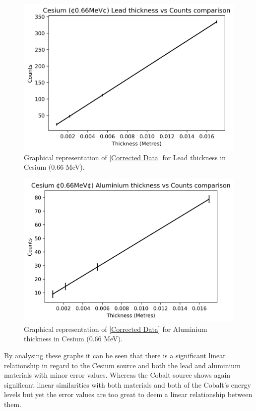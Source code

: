 \documentclass[12pt]{article}
\begin{document}
\begin{multicols}{2}
\begin{figure}[H]
\centering
\includegraphics[scale=0.6]{Images/CesiumLead066Final.png}
\caption{Graphical representation of \cref{Corrected Data} for Lead thickness in Cesium (0.66 MeV).}
\label{Cesium 066 Lead Counts}
\end{figure}

\begin{figure}[H]
\centering
\includegraphics[scale=0.6]{Images/CesiumAlu066Final.png}
\caption{Graphical representation of \cref{Corrected Data} for Aluminium thickness in Cesium (0.66 MeV).}
\label{Cesium 066 Alu Counts}
\end{figure}
\end{multicols}

By analysing these graphs it can be seen that there is a significant linear relationship in regard to the Cesium source and both the lead and aluminium materials with minor error values. Whereas the Cobalt source shows again significant linear similarities with both materials and both of the Cobalt's energy levels but yet the error values are too great to deem a linear relationship between them.
\end{document}
